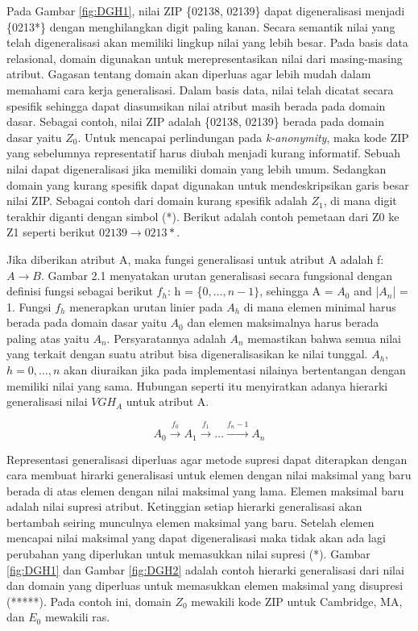 Pada Gambar \ref{fig:DGH1}, nilai ZIP \{02138, 02139\} dapat digeneralisasi menjadi \{0213*\} dengan menghilangkan digit paling kanan. Secara semantik nilai yang telah digeneralisasi akan memiliki lingkup nilai yang lebih besar. Pada basis data relasional, domain digunakan untuk merepresentasikan nilai dari masing-masing atribut. Gagasan tentang domain akan diperluas agar lebih mudah dalam memahami cara kerja generalisasi. Dalam basis data, nilai telah dicatat secara spesifik sehingga dapat diasumsikan nilai atribut masih berada pada domain dasar. Sebagai contoh, nilai ZIP adalah \{02138, 02139\} berada pada domain dasar yaitu $Z_0$. Untuk mencapai perlindungan pada \textit{k-anonymity}, maka kode ZIP yang sebelumnya representatif harus diubah menjadi kurang informatif. Sebuah nilai dapat digeneralisasi jika memiliki domain yang lebih umum. Sedangkan domain yang kurang spesifik dapat digunakan untuk mendeskripsikan garis besar nilai ZIP. Sebagai contoh dari domain kurang spesifik adalah $Z_1$, di mana digit terakhir diganti dengan simbol (*). Berikut adalah contoh pemetaan dari Z0 ke Z1 seperti berikut $02139 \rightarrow 0213*$.

\newpage
Jika diberikan atribut A, maka fungsi generalisasi untuk atribut A adalah f: $A \rightarrow B$. Gambar 2.1 menyatakan urutan generalisasi secara fungsional dengan definisi fungsi sebagai berikut $f_h$: h = \{$0,\ldots, n-1\}$, sehingga A = $A_0$ and |$A_n$| = 1. Fungsi $f_h$ menerapkan urutan linier pada $A_h$ di mana elemen minimal harus berada pada domain dasar yaitu $A_0$ dan elemen maksimalnya harus berada paling atas yaitu $A_n$. Persyaratannya adalah $A_n$ memastikan bahwa semua nilai yang terkait dengan suatu atribut bisa digeneralisasikan ke nilai tunggal. $A_h$, $h = 0, \ldots, n$ akan diuraikan jika pada implementasi nilainya bertentangan dengan memiliki nilai yang sama. Hubungan seperti itu menyiratkan adanya hierarki generalisasi nilai $VGH_A$ untuk atribut A. 

\[
  A_0 \overset{f_0} {\longrightarrow} A_1 \overset{f_1} {\longrightarrow} \mathcal{\ldots} \overset{f_n-1}{\longrightarrow} A_n
\]

Representasi generalisasi diperluas agar metode supresi dapat diterapkan dengan cara membuat hirarki generalisasi untuk elemen dengan nilai maksimal yang baru berada di atas elemen dengan nilai maksimal yang lama. Elemen maksimal baru adalah nilai supresi atribut. Ketinggian setiap hierarki generalisasi akan bertambah seiring munculnya elemen maksimal yang baru. Setelah elemen mencapai nilai maksimal yang dapat digeneralisasi maka tidak akan ada lagi perubahan yang diperlukan untuk memasukkan nilai supresi (*). Gambar \ref{fig:DGH1} dan Gambar \ref{fig:DGH2} adalah contoh hierarki generalisasi dari nilai dan domain yang diperluas untuk memasukkan elemen maksimal yang disupresi (*****). Pada contoh ini, domain $Z_0$ mewakili kode ZIP untuk Cambridge, MA, dan $E_0$ mewakili ras.

